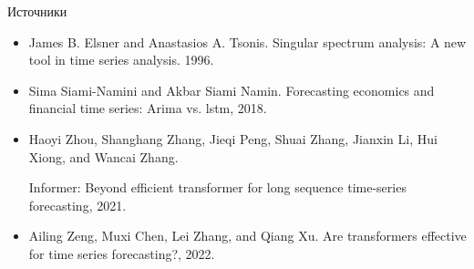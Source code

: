 \documentclass{beamer}
\begin{document}
\begin{frame}{Источники}
	\begin{itemize}
		\item James B. Elsner and Anastasios A. Tsonis. Singular spectrum analysis: A new tool in time series analysis.
		1996.
		
		\item Sima Siami-Namini and Akbar Siami Namin. Forecasting economics and financial time series: Arima vs.
		lstm, 2018.
		
		\item Haoyi Zhou, Shanghang Zhang, Jieqi Peng, Shuai Zhang, Jianxin Li, Hui Xiong, and Wancai Zhang.
		
		Informer: Beyond efficient transformer for long sequence time-series forecasting, 2021.
		\item Ailing Zeng, Muxi Chen, Lei Zhang, and Qiang Xu. Are transformers effective for time series forecasting?,
		2022.
		
	\end{itemize}
\end{frame}
\end{document}

